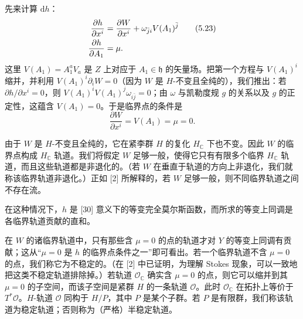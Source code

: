 \documentclass[11pt,a4paper,UTF8]{ctexart}
\theoremstyle{plain}
\theoremstyle{definition}
\begin{document}
先来计算 $\mathrm dh$：
\begin{align}
    \frac{\partial h}{\partial x^i}&=\frac{\partial W}{\partial x^i}
    +\omega_{\bar j i}V(A_1)^{\bar j} \tag{5.23}\\
    \frac{\partial h}{\partial A_1}&=\mu. \notag
\end{align}
这里 $V(A_1)=A_1^aV_a$ 是 $Z$ 上对应于 $A_1\in\mathfrak h$ 的矢量场。把第一个方程与 $V(A_1)^i$ 缩并，并利用 $V(A_1)^i\partial_iW=0$（因为 $W$ 是 $H$-不变且全纯的），我们推出：若 $\partial h/\partial x^i=0$，则 $V(A_1)^iV(A_1)^j\omega_{i\bar j}=0$；由 $\omega$ 与凯勒度规 $g$ 的关系以及 $g$ 的正定性，这蕴含 $V(A_1)=0$。于是临界点的条件是
\begin{equation}
    \frac{\partial W}{\partial x^i}=V(A_1)=\mu=0.
    \tag{5.24}
\end{equation}


由于 $W$ 是 $H$-不变且全纯的，它在紧李群 $H$ 的复化 $H_{\mathbb C}$ 下也不变。因此 $W$ 的临界点构成 $H_{\mathbb C}$ 轨道。我们将假定 $W$ 足够一般，使得它只有有限多个临界 $H_{\mathbb C}$ 轨道，而且这些轨道都是非退化的。（若 $W$ 在垂直于轨道的方向上非退化，我们就称该临界轨道非退化。）正如 [2] 所解释的，若 $W$ 足够一般，则不同临界轨道之间不存在流。


在这种情况下，$h$ 是 [30] 意义下的等变完全莫尔斯函数，而所求的等变上同调是各临界轨道贡献的直和。

在 $W$ 的诸临界轨道中，只有那些含 $\mu=0$ 的点的轨道才对 $Y$ 的等变上同调有贡献；这从“$\mu=0$ 是 $h$ 的临界点条件之一”即可看出。若一个临界轨道不含 $\mu=0$ 的点，我们称它为不稳定的。（在 [2] 中已证明，为理解 Stokes 现象，可以一致地把这类不稳定轨道排除掉。）若轨道 $\mathcal O_{\mathbb C}$ 确实含 $\mu=0$ 的点，则它可以缩并到其 $\mu=0$ 的子空间，而该子空间是紧群 $H$ 的一条轨道 $\mathcal O$。此时 $\mathcal O_{\mathbb C}$ 在拓扑上等价于 $T^*\mathcal O$。$H$-轨道 $\mathcal O$ 同构于 $H/P$，其中 $P$ 是某个子群。若 $P$ 是有限群，我们称该轨道为稳定轨道；否则称为（严格）半稳定轨道。
\end{document}
